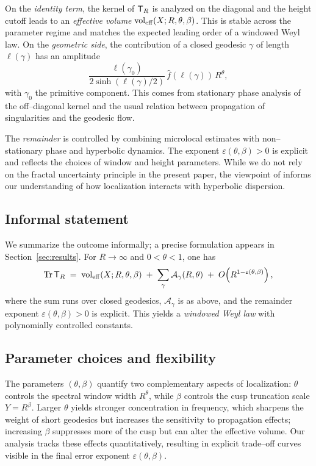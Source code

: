 On the \emph{identity term}, the kernel of $\mathsf{T}_R$ is analyzed on the diagonal and the
height cutoff leads to an \emph{effective volume} $\operatorname{vol}_{\mathrm{eff}}(X;R,\theta,\beta)$.
This is stable across the parameter regime and matches the expected leading order of a
windowed Weyl law. On the \emph{geometric side}, the contribution of a closed geodesic
$\gamma$ of length $\ell(\gamma)$ has an amplitude
\[
  \frac{\ell(\gamma_0)}{2\sinh(\ell(\gamma)/2)}\,\widehat{f}(\ell(\gamma))\,R^\theta,
\]
with $\gamma_0$ the primitive component. This comes from stationary phase analysis of the
off--diagonal kernel and the usual relation between propagation of singularities and the
geodesic flow.

The \emph{remainder} is controlled by combining microlocal estimates with non--stationary
phase and hyperbolic dynamics. The exponent $\varepsilon(\theta,\beta)>0$ is explicit and
reflects the choices of window and height parameters. While we do not rely on the fractal
uncertainty principle in the present paper, the viewpoint of
\cite{dyatlov2018,dyatlov2019,danetel2018} informs our understanding of how localization
interacts with hyperbolic dispersion.

\subsection{Informal statement}
We summarize the outcome informally; a precise formulation appears in
Section~\ref{sec:results}. For $R\to\infty$ and $0<\theta<1$, one has
\[
  \mathrm{Tr}\,\mathsf{T}_R \;=\;
  \operatorname{vol}_{\mathrm{eff}}(X;R,\theta,\beta) \;+\;
  \sum_{\gamma}\mathcal{A}_\gamma(R,\theta) \;+\;
  O\!\left(R^{1-\varepsilon(\theta,\beta)}\right),
\]
where the sum runs over closed geodesics, $\mathcal{A}_\gamma$ is as above, and the
remainder exponent $\varepsilon(\theta,\beta)>0$ is explicit. This yields a
\emph{windowed Weyl law} with polynomially controlled constants.

\subsection{Parameter choices and flexibility}\label{subsec:params}
The parameters $(\theta,\beta)$ quantify two complementary aspects of localization:
$\theta$ controls the spectral window width $R^\theta$, while $\beta$ controls the cusp
truncation scale $Y=R^\beta$. Larger $\theta$ yields stronger concentration in frequency,
which sharpens the weight of short geodesics but increases the sensitivity to propagation
effects; increasing $\beta$ suppresses more of the cusp but can alter the effective
volume. Our analysis tracks these effects quantitatively, resulting in explicit trade--off
curves visible in the final error exponent $\varepsilon(\theta,\beta)$.

